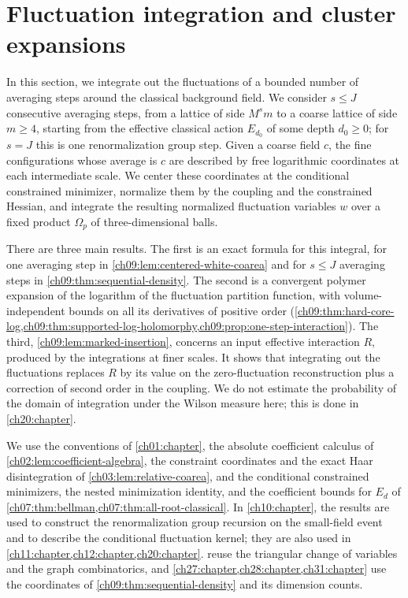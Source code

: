 \chapter{Fluctuation integration and cluster expansions}\label{ch09:chapter}

In this section, we integrate out the fluctuations of a bounded number of averaging steps around the classical background field. We consider $s\le J$ consecutive averaging steps, from a lattice of side $M^sm$ to a coarse lattice of side $m\ge4$, starting from the effective classical action $E_{d_0}$ of some depth $d_0\ge0$; for $s=J$ this is one renormalization group step. Given a coarse field $c$, the fine configurations whose average is $c$ are described by free logarithmic coordinates at each intermediate scale. We center these coordinates at the conditional constrained minimizer, normalize them by the coupling and the constrained Hessian, and integrate the resulting normalized fluctuation variables $w$ over a fixed product $\Omega_p$ of three-dimensional balls.

There are three main results. The first is an exact formula for this integral, for one averaging step in \cref{ch09:lem:centered-white-coarea} and for $s\le J$ averaging steps in \cref{ch09:thm:sequential-density}. The second is a convergent polymer expansion of the logarithm of the fluctuation partition function, with volume-independent bounds on all its derivatives of positive order (\cref{ch09:thm:hard-core-log,ch09:thm:supported-log-holomorphy,ch09:prop:one-step-interaction}). The third, \cref{ch09:lem:marked-insertion}, concerns an input effective interaction $R$, produced by the integrations at finer scales. It shows that integrating out the fluctuations replaces $R$ by its value on the zero-fluctuation reconstruction plus a correction of second order in the coupling. We do not estimate the probability of the domain of integration under the Wilson measure here; this is done in \cref{ch20:chapter}.

We use the conventions of \cref{ch01:chapter}, the absolute coefficient calculus of \cref{ch02:lem:coefficient-algebra}, the constraint coordinates and the exact Haar disintegration of \cref{ch03:lem:relative-coarea}, and the conditional constrained minimizers, the nested minimization identity, and the coefficient bounds for $E_d$ of \cref{ch07:thm:bellman,ch07:thm:all-root-classical}. In \cref{ch10:chapter}, the results are used to construct the renormalization group recursion on the small-field event and to describe the conditional fluctuation kernel; they are also used in \cref{ch11:chapter,ch12:chapter,ch20:chapter}.  reuse the triangular change of variables and the graph combinatorics, and \cref{ch27:chapter,ch28:chapter,ch31:chapter} use the coordinates of \cref{ch09:thm:sequential-density} and its dimension counts.

